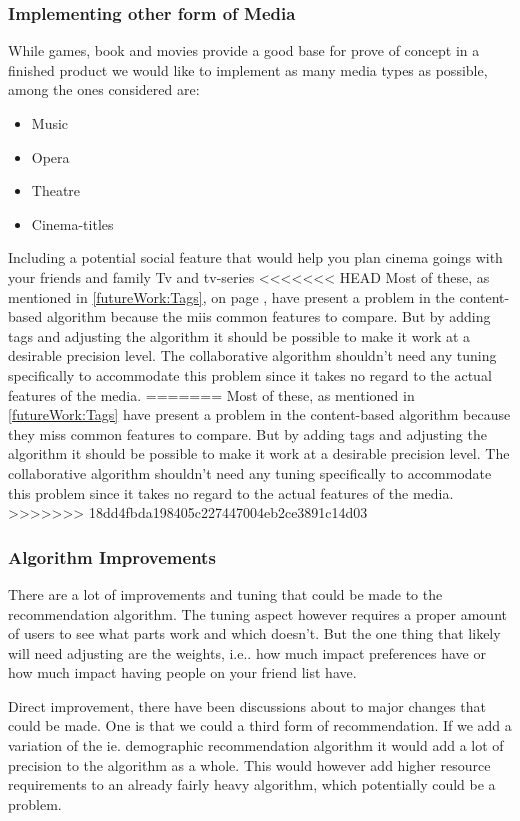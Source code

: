 \subsubsection{Implementing other form of Media}
While games, book and movies provide a good base for prove of concept in a finished product we would like to implement as many media types as possible, among the ones considered are:
\begin{itemize}
\item Music
\item Opera
\item Theatre
\item Cinema-titles
\end{itemize}

Including a potential social feature that would help you plan cinema goings with your friends and family
Tv and tv-series
<<<<<<< HEAD
Most of these, as mentioned in \ref{futureWork:Tags}, on page \pageref{futureWork:Tags}, have present a problem in the content-based algorithm because the miis common features to compare. But by adding tags and adjusting the algorithm it should be possible to make it work at a desirable precision level. The collaborative algorithm shouldn’t need any tuning specifically to accommodate this problem since it takes no regard to the actual features of the media.
=======
Most of these, as mentioned in \ref{futureWork:Tags} have present a problem in the content-based algorithm because they miss common features to compare. But by adding tags and adjusting the algorithm it should be possible to make it work at a desirable precision level. The collaborative algorithm shouldn't need any tuning specifically to accommodate this problem since it takes no regard to the actual features of the media.
>>>>>>> 18dd4fbda198405c227447004eb2ce3891c14d03

\subsubsection{Algorithm Improvements}
There are a lot of improvements and tuning that could be made to the recommendation algorithm. The tuning aspect however requires a proper amount of users to see what parts work and which doesn't. But the one thing that likely will need adjusting are the weights, i.e.. how much impact preferences have or how much impact having people on your friend list have.

Direct improvement, there have been discussions about to major changes that could be made. One is that we could a third form of recommendation. If we add a variation of the ie. demographic recommendation algorithm it would add a lot of precision to the algorithm as a whole. This would however add higher resource requirements to an already fairly heavy algorithm, which potentially could be a problem.

